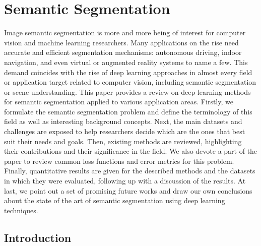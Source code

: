 \chapter{Semantic Segmentation}
\label{cha:semseg}

\begin{chapterabstract}
Image semantic segmentation is more and more being of interest for computer vision and machine learning researchers. Many applications on the rise need accurate and efficient segmentation mechanisms: autonomous driving, indoor navigation, and even virtual or augmented reality systems to name a few. This demand coincides with the rise of deep learning approaches in almost every field or application target related to computer vision, including semantic segmentation or scene understanding. This paper provides a review on deep learning methods for semantic segmentation applied to various application areas. Firstly, we formulate the semantic segmentation problem and define the terminology of this field as well as interesting background concepts. Next, the main datasets and challenges are exposed to help researchers decide which are the ones that best suit their needs and goals. Then, existing methods are reviewed, highlighting their contributions and their significance in the field. We also devote a part of the paper to review common loss functions and error metrics for this problem. Finally, quantitative results are given for the described methods and the datasets in which they were evaluated, following up with a discussion of the results. At last, we point out a set of promising future works and draw our own conclusions about the state of the art of semantic segmentation using deep learning techniques.
\end{chapterabstract}

\clearpage

\section{Introduction}
\label{cha:semseg:sec:introduction}

